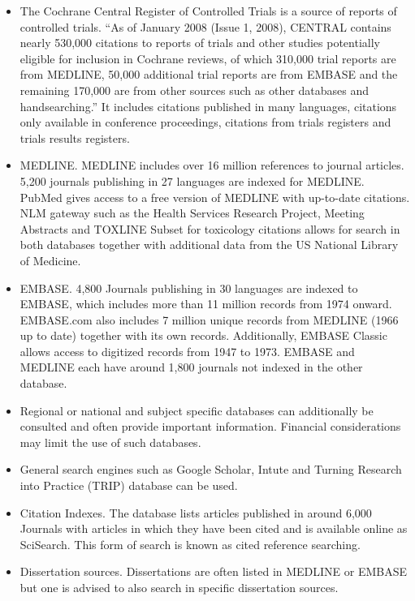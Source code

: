 \documentclass[11pt,a4paper,twoside]{book}\usepackage[]{graphicx}\usepackage[]{color}
\begin{document}
\begin{itemize}
\item The Cochrane Central Register of Controlled Trials is a source of reports of controlled trials. ``As of January 2008 (Issue 1, 2008), CENTRAL contains nearly 530,000 citations to reports of trials and other studies potentially eligible for inclusion in Cochrane reviews, of which 310,000 trial reports are from MEDLINE, 50,000 additional trial reports are from EMBASE and the remaining 170,000 are from other sources such as other databases and handsearching.'' It includes citations published in many languages, citations only available in conference proceedings, citations from trials registers and trials results registers.
\item MEDLINE. MEDLINE includes over 16 million references to journal articles. 5,200 journals publishing in 27 languages are indexed for MEDLINE. PubMed gives access to a free version of MEDLINE with up-to-date citations. NLM gateway such as the Health Services Research Project, Meeting Abstracts and TOXLINE Subset for toxicology citations allows for search in both databases together with additional data from the US National Library of Medicine.
\item EMBASE. 4,800 Journals publishing in 30 languages are indexed to EMBASE, which includes more than 11 million records from 1974 onward. EMBASE.com also includes 7 million unique records from MEDLINE (1966 up to date) together with its own records. Additionally, EMBASE Classic allows access to digitized records from 1947 to 1973. EMBASE and MEDLINE each have around 1,800 journals not indexed in the other database.
\item Regional or national and subject specific databases can additionally be consulted and often provide important information. Financial considerations may limit the use of such databases.
\item General search engines such as Google Scholar, Intute and Turning Research into Practice (TRIP) database can be used.
\item Citation Indexes. The database lists articles published in around 6,000 Journals with articles in which they have been cited and is available online as SciSearch. This form of search is known as cited reference searching.
\item Dissertation sources. Dissertations are often listed in MEDLINE or EMBASE but one is advised to also search in specific dissertation sources.

\end{itemize}
\end{document}
